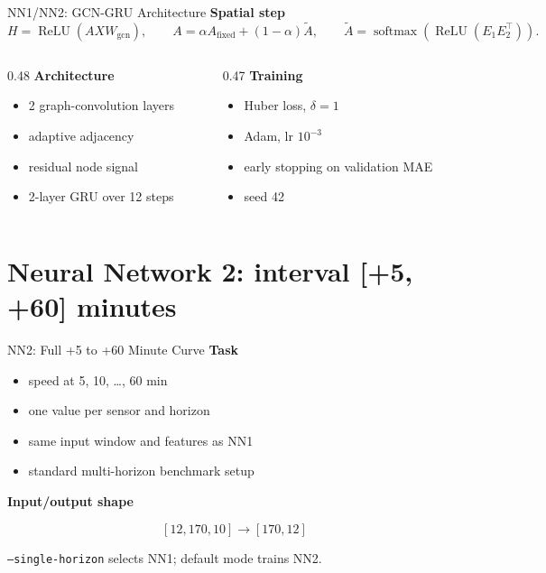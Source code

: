 \documentclass[aspectratio=169]{beamer}
\begin{document}
\begin{frame}{NN1/NN2: GCN-GRU Architecture}
\footnotesize
\textbf{Spatial step}
\[
H = \operatorname{ReLU}(A X W_{\mathrm{gcn}}), \qquad
A = \alpha A_{\mathrm{fixed}} + (1-\alpha)\tilde{A}, \qquad
\tilde{A} = \operatorname{softmax}(\operatorname{ReLU}(E_1E_2^\top)).
\]

\vspace{-0.4em}
\begin{columns}[T,totalwidth=\textwidth]
\begin{column}{0.48\textwidth}
\textbf{Architecture}
\begin{itemize}
  \item 2 graph-convolution layers
  \item adaptive adjacency
  \item residual node signal
  \item 2-layer GRU over 12 steps
\end{itemize}
\end{column}
\begin{column}{0.47\textwidth}
\textbf{Training}
\begin{itemize}
  \item Huber loss, $\delta = 1$
  \item Adam, lr $10^{-3}$
  \item early stopping on validation MAE
  \item seed 42
\end{itemize}
\end{column}
\end{columns}
\end{frame}

\section[NN2]{Neural Network 2: interval [+5, +60] minutes}

\begin{frame}{NN2: Full +5 to +60 Minute Curve}
\small
\textbf{Task}

\begin{itemize}
  \item speed at 5, 10, \ldots, 60 min
  \item one value per sensor and horizon
  \item same input window and features as NN1
  \item standard multi-horizon benchmark setup
\end{itemize}

\vspace{0.8em}
\textbf{Input/output shape}

\[
[12, 170, 10] \rightarrow [170, 12]
\]

\vspace{0.5em}
\texttt{--single-horizon} selects NN1; default mode trains NN2.
\end{frame}
\end{document}
